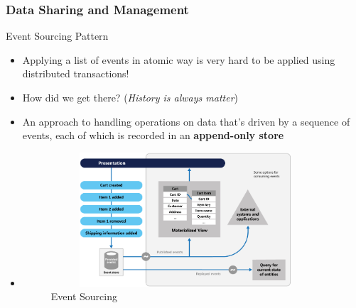 \documentclass{beamer}
\begin{document}
	\begin{frame}
		\frametitle{Data Sharing and Management}
			Event Sourcing Pattern
			\begin{itemize}
				\item<1->[] \scriptsize{Applying a list of events in atomic way is very hard to be applied using distributed transactions!}
				\vspace{1mm}
				\item<2-> \scriptsize{How did we get there? (\textit{History is always matter})}
				\item<3-> \scriptsize{An approach to handling operations on data that's driven by a sequence of events, each of which is recorded in an \textbf{append-only store}}
				\item<3->[]
				\begin{figure}[h]
					\includegraphics[width=100mm,height= 50mm, scale=1]{img/event-sourcing-overview.png}
					\caption{Event Sourcing}
				\end{figure}
		\end{itemize}
	\end{frame}
	
\end{document}

